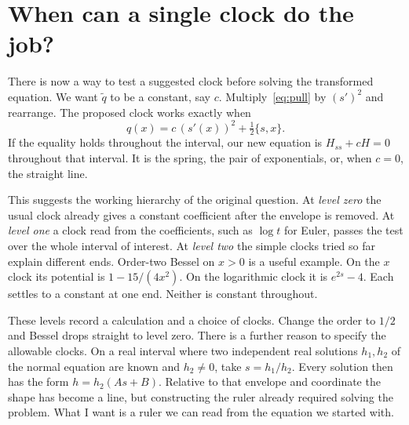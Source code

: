 \documentclass[11pt,a4paper]{amsart}
\theoremstyle{definition}
\theoremstyle{remark}
\begin{document}
\section{When can a single clock do the job?}\label{sec:autonomy}
There is now a way to test a suggested clock before solving the transformed equation. We want \(\widetilde q\) to be a constant, say \(c\). Multiply~\eqref{eq:pull} by \((s')^2\) and rearrange. The proposed clock works exactly when
\begin{equation}\label{eq:test}
 q(x)=c\,(s'(x))^2+\tfrac12\{s,x\}.
\end{equation}
If the equality holds throughout the interval, our new equation is \(H_{ss}+cH=0\) throughout that interval. It is the spring, the pair of exponentials, or, when \(c=0\), the straight line.

This suggests the working hierarchy of the original question. At \emph{level zero} the usual clock already gives a constant coefficient after the envelope is removed. At \emph{level one} a clock read from the coefficients, such as \(\log t\) for Euler, passes the test over the whole interval of interest. At \emph{level two} the simple clocks tried so far explain different ends. Order-two Bessel on \(x>0\) is a useful example. On the \(x\) clock its potential is \(1-15/(4x^2)\). On the logarithmic clock it is \(e^{2s}-4\). Each settles to a constant at one end. Neither is constant throughout.

These levels record a calculation and a choice of clocks. Change the order to \(1/2\) and Bessel drops straight to level zero. There is a further reason to specify the allowable clocks. On a real interval where two independent real solutions \(h_1,h_2\) of the normal equation are known and \(h_2\ne0\), take \(s=h_1/h_2\). Every solution then has the form \(h=h_2(As+B)\). Relative to that envelope and coordinate the shape has become a line, but constructing the ruler already required solving the problem. What I want is a ruler we can read from the equation we started with.
\end{document}
